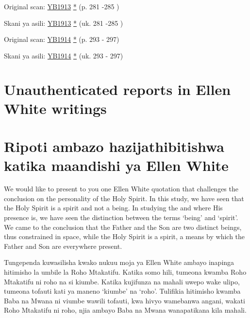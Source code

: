 



Original scan: \href{https://documents.adventistarchives.org/Yearbooks/YB1913.pdf#search=Yearbook%201913}{YB1913} \href{https://forgotten-pillar.s3.us-east-2.amazonaws.com/YB1913.pdf}{*} (p. 281 -285 )


Skani ya asili: \href{https://documents.adventistarchives.org/Yearbooks/YB1913.pdf#search=Yearbook%201913}{YB1913} \href{https://forgotten-pillar.s3.us-east-2.amazonaws.com/YB1913.pdf}{*} (uk. 281 -285 )


Original scan: \href{https://documents.adventistarchives.org/Yearbooks/YB1914.pdf#search=Yearbook%201914}{YB1914} \href{https://forgotten-pillar.s3.us-east-2.amazonaws.com/YB1914.pdf}{*} (p. 293 - 297)


Skani ya asili: \href{https://documents.adventistarchives.org/Yearbooks/YB1914.pdf#search=Yearbook%201914}{YB1914} \href{https://forgotten-pillar.s3.us-east-2.amazonaws.com/YB1914.pdf}{*} (uk. 293 - 297)


\section*{Unauthenticated reports in Ellen White writings}


\section*{Ripoti ambazo hazijathibitishwa katika maandishi ya Ellen White}


\label{appendix:unauthenticated-reports}
We would like to present to you one Ellen White quotation that challenges the conclusion on the personality of the Holy Spirit. In this study, we have seen that the Holy Spirit is a spirit and not a being. In studying the  and where His presence is, we have seen the distinction between the terms ‘being’ and ‘spirit’. We came to the conclusion that the Father and the Son are two distinct beings, thus constrained in space, while the Holy Spirit is a spirit, a means by which the Father and Son are everywhere present.


\label{appendix:unauthenticated-reports}
Tungependa kuwasilisha kwako nukuu moja ya Ellen White ambayo inapinga hitimisho la umbile la Roho Mtakatifu. Katika somo hili, tumeona kwamba Roho Mtakatifu ni roho na si kiumbe. Katika kujifunza  na mahali uwepo wake ulipo, tumeona tofauti kati ya maneno ‘kiumbe’ na ‘roho’. Tulifikia hitimisho kwamba Baba na Mwana ni viumbe wawili tofauti, kwa hivyo wamebanwa angani, wakati Roho Mtakatifu ni roho, njia ambayo Baba na Mwana wanapatikana kila mahali.


